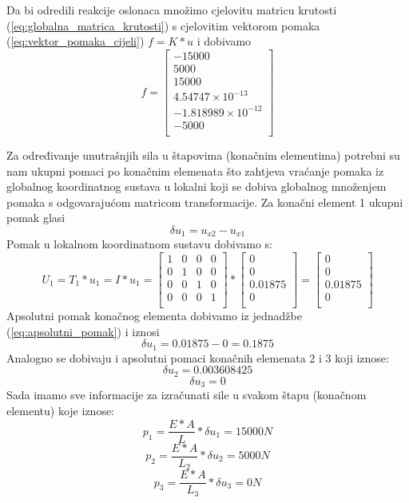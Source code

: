 \documentclass[a4paper,twoside,12pt]{memoir} %
\begin{document}
Da bi odredili reakcije oslonaca množimo cjelovitu matricu krutosti (\ref{eq:globalna_matrica_krutosti}) s cjelovitim vektorom pomaka (\ref{eq:vektor_pomaka_cijeli}) $f = K * u$ i dobivamo
\begin{equation}
\label{eq:reakcije_oslonaca}
    f =
    \begin{bmatrix}
    -15000 \\ 
    5000 \\ 
    15000 \\ 
    4.54747 \times 10^{-13} \\ 
    -1.818989 \times 10^{-12} \\ 
    -5000 \\
    \end{bmatrix}
\end{equation}

Za određivanje unutrašnjih sila u štapovima (konačnim elementima) potrebni su nam ukupni pomaci po konačnim elemenata što zahtjeva vraćanje pomaka iz globalnog koordinatnog sustava u lokalni koji se dobiva globalnog množenjem pomaka s odgovarajućom matricom transformacije. Za konačni element 1 ukupni pomak glasi 
\begin{equation}
\label{eq:apsolutni_pomak}
\delta u_1 = u_{x2} - u_{x1}
\end{equation}
Pomak u lokalnom koordinatnom sustavu dobivamo s:
\begin{equation}
\label{eq:transformacija_u_lokalni}
    U_1 = T_1 * u_1 = I * u_1 =
    \begin{bmatrix}
    1 & 0 & 0 & 0 \\
    0 & 1 & 0 & 0 \\
    0 & 0 & 1 & 0 \\
    0 & 0 & 0 & 1 \\
    \end{bmatrix} 
    *
    \begin{bmatrix}
    0 \\ 0 \\ 0.01875 \\ 0 \\
    \end{bmatrix}
    = 
    \begin{bmatrix}
    0 \\ 0 \\ 0.01875 \\ 0 \\
    \end{bmatrix}
\end{equation}
Apsolutni pomak konačnog elementa dobivamo iz jednadžbe (\ref{eq:apsolutni_pomak}) i iznosi $$\delta u_1 = 0.01875 - 0 = 0.1875 $$
Analogno se dobivaju i apsolutni pomaci konačnih elemenata 2 i 3 koji iznose: 
$$\delta u_2 = 0.003608425$$
$$\delta u_3 = 0$$
Sada imamo sve informacije za izračunati sile u svakom štapu (konačnom elementu) koje iznose:
$$p_1 = \frac{E * A}{L} * \delta u_1 = 15000 N$$
$$p_2 = \frac{E * A}{L_2} * \delta u_2 = 5000 N$$
$$p_3 = \frac{E * A}{L_3} * \delta u_3 = 0 N $$
\end{document}
